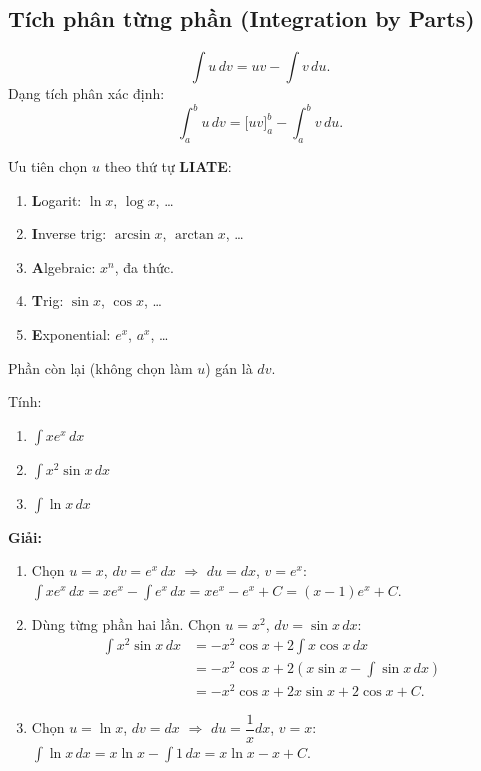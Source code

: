 \documentclass[12pt,a4paper]{article}
\begin{document}
\subsection{Tích phân từng phần (Integration by Parts)}

\begin{congthuc}[title={Công thức tích phân từng phần}]
  \[
    \int u\,dv = uv - \int v\,du.
  \]
  Dạng tích phân xác định:
  \[
    \int_a^b u\,dv = \bigl[uv\bigr]_a^b - \int_a^b v\,du.
  \]
\end{congthuc}

\begin{phuongphap}[title={Chọn $u$ và $dv$ -- Quy tắc LIATE}]
  Ưu tiên chọn $u$ theo thứ tự \textbf{LIATE}:
  \begin{enumerate}
    \item \textbf{L}ogarit: $\ln x$, $\log x$, \ldots
    \item \textbf{I}nverse trig: $\arcsin x$, $\arctan x$, \ldots
    \item \textbf{A}lgebraic: $x^n$, đa thức.
    \item \textbf{T}rig: $\sin x$, $\cos x$, \ldots
    \item \textbf{E}xponential: $e^x$, $a^x$, \ldots
  \end{enumerate}
  Phần còn lại (không chọn làm $u$) gán là $dv$.
\end{phuongphap}

\begin{vidu}
  Tính:
  \begin{enumerate}[label=(\alph*)]
    \item $\displaystyle\int x e^x\,dx$
    \item $\displaystyle\int x^2 \sin x\,dx$
    \item $\displaystyle\int \ln x\,dx$
  \end{enumerate}

  \medskip\textbf{Giải:}
  \begin{enumerate}[label=(\alph*)]
    \item Chọn $u = x$, $dv = e^x\,dx$ $\Rightarrow$ $du = dx$, $v = e^x$:
      $\displaystyle\int x e^x\,dx = xe^x - \int e^x\,dx = xe^x - e^x + C = (x-1)e^x + C$.

    \item Dùng từng phần hai lần. Chọn $u = x^2$, $dv = \sin x\,dx$:
      \begin{align*}
        \int x^2 \sin x\,dx &= -x^2 \cos x + 2\int x \cos x\,dx \\
        &= -x^2\cos x + 2\left(x\sin x - \int\sin x\,dx\right) \\
        &= -x^2\cos x + 2x\sin x + 2\cos x + C.
      \end{align*}

    \item Chọn $u = \ln x$, $dv = dx$ $\Rightarrow$ $du = \dfrac{1}{x}dx$, $v = x$:
      $\displaystyle\int \ln x\,dx = x\ln x - \int 1\,dx = x\ln x - x + C$.
  \end{enumerate}
\end{vidu}
\end{document}
